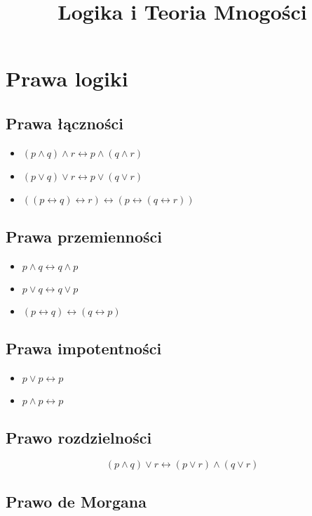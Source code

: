 \documentclass{../notatki}
\title{Logika i Teoria Mnogości}
\begin{document}
\tableofcontents

\section{Prawa logiki}

\subsection{Prawa łączności}

\begin{itemize}
  \item $(p \land q) \land r \leftrightarrow p \land (q \land r)$
  \item $(p \lor q) \lor r \leftrightarrow p \lor (q \lor r)$
  \item $((p \leftrightarrow q) \leftrightarrow r) \leftrightarrow (p
    \leftrightarrow (q \leftrightarrow r))$
\end{itemize}

\subsection{Prawa przemienności}

\begin{itemize}
  \item $p \land q \leftrightarrow q \land p$
  \item $p \lor q \leftrightarrow q \lor p$
  \item $(p \leftrightarrow q) \leftrightarrow (q \leftrightarrow p)$
\end{itemize}

\subsection{Prawa impotentności}

\begin{itemize}
  \item $p \lor p \leftrightarrow p$
  \item $p \land p \leftrightarrow p$
\end{itemize}

\subsection{Prawo rozdzielności}

$$(p \land q) \lor r \leftrightarrow (p \lor r) \land (q \lor r)$$

\subsection{Prawo de Morgana}
\end{document}
